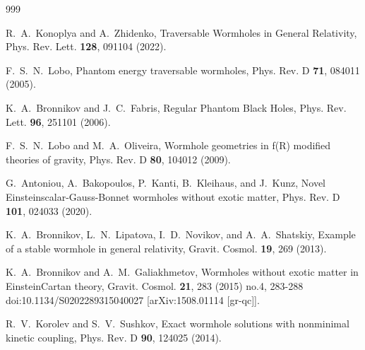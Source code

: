 \documentclass[aps,preprint,groupedaddress,nofootinbib,superscriptaddress,showkeys,showpacs,eqsecnum,amsmath,amssymb]{revtex4-1}
\begin{document}
\begin{thebibliography}{999}


R.~A.~Konoplya and A.~Zhidenko,
Traversable Wormholes in General Relativity,
Phys. Rev. Lett. \textbf{128}, 091104 (2022).


F.~S.~N.~Lobo,
Phantom energy traversable wormholes,
Phys. Rev. D \textbf{71}, 084011 (2005).

K.~A.~Bronnikov and J.~C.~Fabris,
Regular Phantom Black Holes,
Phys. Rev. Lett. \textbf{96}, 251101 (2006).











F.~S.~N.~Lobo and M.~A.~Oliveira,
Wormhole geometries in f(R) modified theories of gravity,
Phys. Rev. D \textbf{80}, 104012 (2009).


G.~Antoniou, A.~Bakopoulos, P.~Kanti, B.~Kleihaus, and J.~Kunz,
Novel Einstein\textendash{}scalar-Gauss-Bonnet wormholes without exotic matter,
Phys. Rev. D \textbf{101}, 024033 (2020).



K.~A.~Bronnikov, L.~N.~Lipatova, I.~D.~Novikov, and A.~A.~Shatskiy,
Example of a stable wormhole in general relativity,
Gravit. Cosmol. \textbf{19}, 269 (2013).

K.~A.~Bronnikov and A.~M.~Galiakhmetov,
Wormholes without exotic matter in Einstein\textendash{}Cartan theory,
Gravit. Cosmol. \textbf{21}, 283 (2015) no.4, 283-288
doi:10.1134/S0202289315040027
[arXiv:1508.01114 [gr-qc]].


R.~V.~Korolev and S.~V.~Sushkov,
Exact wormhole solutions with nonminimal kinetic coupling,
Phys. Rev. D \textbf{90}, 124025 (2014).



\end{thebibliography}
\end{document}
